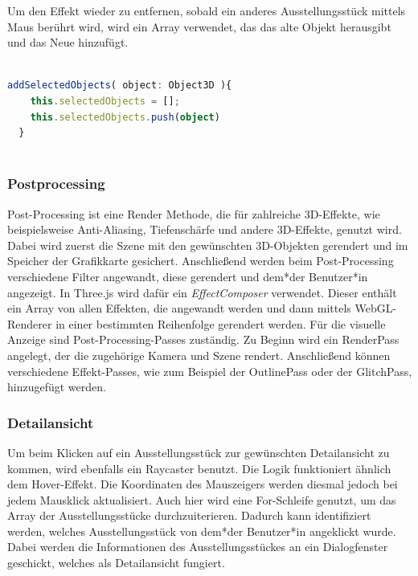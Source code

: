 Um den Effekt wieder zu entfernen, sobald ein anderes Ausstellungsstück mittels Maus berührt wird, wird ein Array verwendet, das das alte Objekt herausgibt und das Neue hinzufügt.

\begin{lstlisting}[caption={Hover-effekt wieder entfernen},language=TypeScript]
    
addSelectedObjects( object: Object3D ){
    this.selectedObjects = [];
    this.selectedObjects.push(object)
  }
    
\end{lstlisting}

\subsubsection{Postprocessing}
Post-Processing ist eine Render Methode, die für zahlreiche 3D-Effekte, wie beispielsweise Anti-Aliasing, Tiefenschärfe und andere 3D-Effekte, genutzt wird. Dabei wird zuerst die Szene mit den gewünschten 3D-Objekten gerendert und im Speicher der Grafikkarte gesichert. Anschließend werden beim Post-Processing verschiedene Filter angewandt, diese gerendert und dem*der Benutzer*in angezeigt. In Three.js wird dafür ein \emph{EffectComposer} verwendet. Dieser enthält ein Array von allen Effekten, die angewandt werden und dann mittels WebGL-Renderer in einer bestimmten Reihenfolge gerendert werden. Für die visuelle Anzeige sind Post-Processing-Passes zuständig. Zu Beginn wird ein RenderPass angelegt, der die zugehörige Kamera und Szene rendert. Anschließend können verschiedene Effekt-Passes, wie zum Beispiel der OutlinePass oder der GlitchPass, hinzugefügt werden. \cite{PostProcessing}

\subsubsection{Detailansicht}

Um beim Klicken auf ein Ausstellungsstück zur gewünschten Detailansicht zu kommen, wird ebenfalls ein Raycaster benutzt. Die Logik funktioniert ähnlich dem Hover-Effekt. Die Koordinaten des Mauszeigers werden diesmal jedoch bei jedem Mausklick aktualisiert. Auch hier wird eine For-Schleife genutzt, um das Array der Ausstellungsstücke durchzuiterieren. Dadurch kann identifiziert werden, welches Ausstellungsstück von dem*der Benutzer*in angeklickt wurde. Dabei werden die Informationen des Ausstellungsstückes an ein Dialogfenster geschickt, welches als Detailansicht fungiert.  

